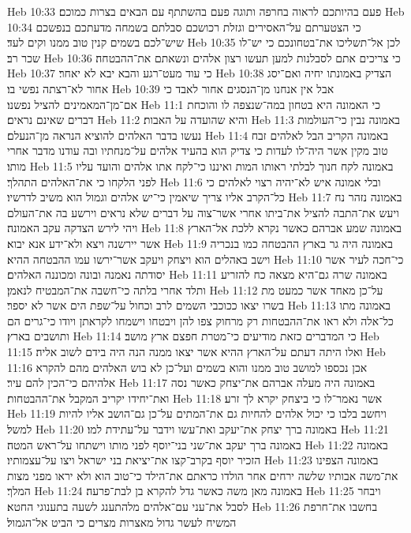 Heb 10:33  פעם בהיותכם לראוה בחרפה ותוגה פעם בהשתתף עם הבאים בצרות כמוכם׃
Heb 10:34  כי הצטערתם על־האסירים וגזלת רכושכם סבלתם בשמחה מדעתכם בנפשכם שיש־לכם בשמים קנין טוב ממנו וקים לעד׃
Heb 10:35  לכן אל־תשליכו את־בטחונכם כי יש־לו שכר רב׃
Heb 10:36  כי צריכים אתם לסבלנות למען תעשו רצון אלהים ונשאתם את־ההבטחה׃
Heb 10:37  כי עוד מעט־רגע והבא יבא לא יאחר׃
Heb 10:38  הצדיק באמונתו יחיה ואם־יסג אחור לא־רצתה נפשי בו׃
Heb 10:39  אבל אין אנחנו מן־הנסגים אחור לאבד כי אם־מן־המאמינים להציל נפשנו׃
Heb 11:1  כי האמונה היא בטחון במה־שנצפה לו והוכחת דברים שאינם נראים׃
Heb 11:2  והיא שהועדה על האבות׃
Heb 11:3  באמונה נבין כי־העולמות נעשו בדבר האלהים להוציא הנראה מן־הנעלם׃
Heb 11:4  באמונה הקריב הבל לאלהים זבח טוב מקין אשר היה־לו לעדות כי צדיק הוא בהעיד אלהים על־מנחתיו ובה עודנו מדבר אחרי מותו׃
Heb 11:5  באמונה לקח חנוך לבלתי ראותו המות ואיננו כי־לקח אתו אלהים והועד עליו לפני הלקחו כי את־האלהים התהלך׃
Heb 11:6  ובלי אמונה איש לא־יהיה רצוי לאלהים כי כל־הקרב אליו צריך שיאמין כי־יש אלהים וגמול הוא משיב לדרשיו׃
Heb 11:7  באמונה נזהר נח ויעש את־התבה להציל את־ביתו אחרי אשר־צוה על דברים שלא נראים וירשע בה את־העולם ויהי לירש הצדקה עקב האמונה׃
Heb 11:8  באמונה שמע אברהם כאשר נקרא ללכת אל־הארץ אשר יירשנה ויצא ולא־ידע אנא יבוא׃
Heb 11:9  באמונה היה גר בארץ ההבטחה כמו בנכריה וישב באהלים הוא ויצחק ויעקב אשר־ירשו עמו ההבטחה ההיא׃
Heb 11:10  כי־חכה לעיר אשר יסודתה נאמנה ובונה ומכוננה האלהים׃
Heb 11:11  באמונה שרה גם־היא מצאה כח להזריע ותלד אחרי בלתה כי־חשבה את־המבטיח לנאמן׃
Heb 11:12  על־כן מאחד אשר כמעט מת בשרו יצאו ככוכבי השמים לרב וכחול על־שפת הים אשר לא יספר׃
Heb 11:13  באמונה מתו כל־אלה ולא ראו את־ההבטחות רק מרחוק צפו להן ויבטחו וישמחו לקראתן ויודו כי־גרים הם ותושבים בארץ׃
Heb 11:14  כי המדברים כזאת מודיעים כי־מטרת חפצם ארץ מושב׃
Heb 11:15  ואלו היתה דעתם על־הארץ ההיא אשר יצאו ממנה הנה היה בידם לשוב אליה׃
Heb 11:16  אכן נכספו למושב טוב ממנו והוא בשמים ועל־כן לא בוש האלהים מהם להקרא אלהיהם כי־הכין להם עיר׃
Heb 11:17  באמונה היה מעלה אברהם את־יצחק כאשר נסה ואת־יחידו יקריב המקבל את־ההבטחות׃
Heb 11:18  אשר נאמר־לו כי ביצחק יקרא לך זרע׃
Heb 11:19  ויחשב בלבו כי יכול אלהים להחיות גם את־המתים על־כן גם־הושב אליו להיות למשל׃
Heb 11:20  באמונה ברך יצחק את־יעקב ואת־עשו וידבר על־עתידת למו׃
Heb 11:21  באמונה ברך יעקב את־שני בני־יוסף לפני מותו וישתחו על־ראש המטה׃
Heb 11:22  באמונה הזכיר יוסף בקרב־קצו את־יציאת בני ישראל ויצו על־עצמותיו׃
Heb 11:23  באמונה הצפינו את־משה אבותיו שלשה ירחים אחר הולדו כראתם את־הילד כי־טוב הוא ולא יראו מפני מצות המלך׃
Heb 11:24  באמונה מאן משה כאשר גדל להקרא בן לבת־פרעה׃
Heb 11:25  ויבחר לסבל את־עני עם־אלהים מלהתענג לשעה בתענוגי החטא׃
Heb 11:26  בחשבו את־חרפת המשיח לעשר גדול מאצרות מצרים כי הביט אל־הגמול׃
